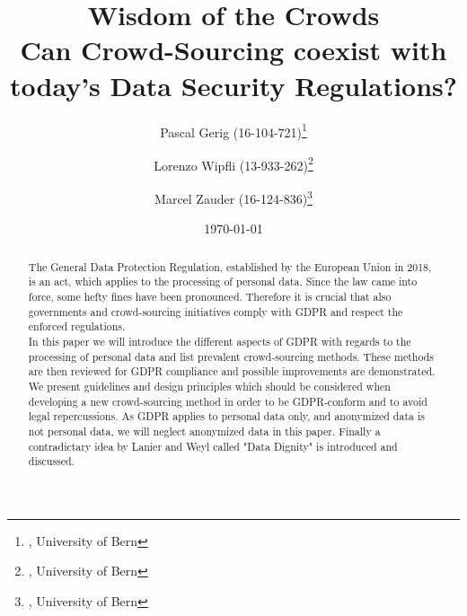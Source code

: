 \documentclass[a4paper,12pt]{report}
\begin{document}

	\title{Wisdom of the Crowds \\ Can Crowd-Sourcing coexist with today’s Data Security Regulations?} %

	\author{Pascal Gerig (16-104-721)\thanks{, University of Bern}
   		\and Lorenzo Wipfli  (13-933-262)\thanks{, University of Bern}
   		\and Marcel Zauder  (16-124-836)\thanks{, University of Bern}
   	}	%



	\date{\today} %

	\maketitle

	\begin{abstract}
		The General Data Protection Regulation, established by the European Union in 2018, is an act, which applies to the processing of personal data. 
		Since the law came into force, some hefty fines have been pronounced. 
		Therefore it is crucial that also governments and crowd-sourcing initiatives comply with GDPR and respect the enforced regulations. \\
		In this paper we will introduce the different aspects of GDPR with regards to the processing of personal data and list prevalent crowd-sourcing methods. 
		These methods are then reviewed for GDPR compliance and possible improvements are demonstrated. 
		We present guidelines and design principles which should be considered when developing a new crowd-sourcing method in order to be GDPR-conform and to avoid legal repercussions. 
		As GDPR applies to personal data only, and anonymized data is not personal data, we will neglect anonymized data in this paper. 
		Finally a contradictary idea by Lanier and Weyl called "Data Dignity" is introduced and discussed.

	\end{abstract}
\end{document}
